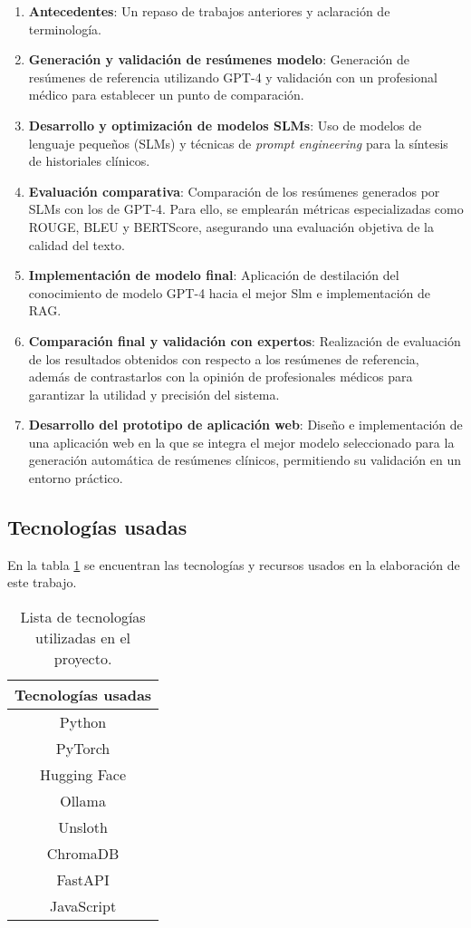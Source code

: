 \documentclass[../main.tex]{subfiles}
\begin{document}
\begin{enumerate}
    \item \textbf{Antecedentes}: Un repaso de trabajos anteriores y aclaración de terminología.
    \item \textbf{Generación y validación de resúmenes modelo}: Generación de resúmenes de referencia utilizando GPT-4 y validación con un profesional médico para establecer un punto de comparación.
    \item \textbf{Desarrollo y optimización de modelos SLMs}: Uso de modelos de lenguaje pequeños (SLMs) y técnicas de \textit{prompt engineering} para la síntesis de historiales clínicos. 
    \item \textbf{Evaluación comparativa}: Comparación de los resúmenes generados por SLMs con los de GPT-4. Para ello, se emplearán métricas especializadas como ROUGE, BLEU y BERTScore, asegurando una evaluación objetiva de la calidad del texto.
    \item \textbf{Implementación de modelo final}: Aplicación de destilación del conocimiento de modelo GPT-4 hacia el mejor Slm e implementación de RAG.

    \item \textbf{Comparación final y validación con expertos}: Realización de  evaluación de los resultados obtenidos con respecto a los resúmenes de referencia, además de contrastarlos con la opinión de profesionales médicos para garantizar la utilidad y precisión del sistema.
    \item \textbf{Desarrollo del prototipo de aplicación web}: Diseño e implementación de una aplicación web en la que se integra el mejor modelo seleccionado para la generación automática de resúmenes clínicos, permitiendo su validación en un entorno práctico.

\end{enumerate}

\subsection{Tecnologías usadas}
En la tabla \ref{tab:tecnologias} se encuentran las tecnologías y recursos usados en la elaboración de este trabajo.
\begin{table}[h]
	\centering
	\captionsetup{skip=2pt} %
	\caption{Lista de tecnologías utilizadas en el proyecto.}
	\label{tab:tecnologias}
	{\small %
		\renewcommand{\arraystretch}{0.9} %
		\begin{tabular}{c}
			\hline
			\textbf{Tecnologías usadas} \\
			\hline
			Python \\
			PyTorch \\
			Hugging Face \\
			Ollama \\
			Unsloth \\
			ChromaDB \\
			FastAPI \\
			JavaScript \\
			\hline
		\end{tabular}
	}
\end{table}
\end{document}

